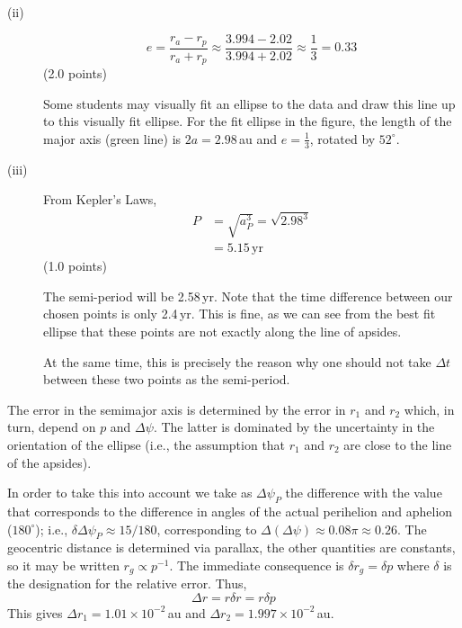 \begin{description}
\begin{description}
  \item[(ii)]
    \[
      e = \frac{r_a - r_p}{r_a + r_p}
        \approx \frac{3.994 - 2.02}{3.994 + 2.02}
        \approx \frac{1}{3} = 0.33
    \]
    \hfill(2.0 points)

    Some students may visually fit an ellipse to the data and draw this line
    up to this visually fit ellipse. For the fit ellipse in the figure, the
    length of the major axis (green line) is $2a = 2.98$\,au and
    $e = \frac{1}{3}$, rotated by $52^\circ$. %

  \item[(iii)] From Kepler's Laws,
    \begin{align*}
      P &= \sqrt{a_P^3} = \sqrt{2.98^3} \\
        &= 5.15\,\mathrm{yr}
    \end{align*}
    \hfill(1.0 points)

    The semi-period will be 2.58\,yr. Note that the time difference between
    our chosen points is only 2.4\,yr. This is fine, as we can see from the
    best fit ellipse that these points are not exactly along the line of
    apsides.

    At the same time, this is precisely the reason why one should not take
    $\Delta t$ between these two points as the semi-period.
  \end{description}

\item[(c)] The error in the semimajor axis is determined by the error in $r_1$
  and $r_2$ which, in turn, depend on $p$ and $\Delta\psi$. The latter is
  dominated by the uncertainty in the orientation of the ellipse (i.e., the
  assumption that $r_1$ and $r_2$ are close to the line of the apsides).

  In order to take this into account we take as $\Delta\psi_P$ the difference
  with the value that corresponds to the difference in angles of the actual
  perihelion and aphelion ($180^\circ$); i.e.,
  $\delta\Delta\psi_P \approx 15/180$, corresponding to
  $\Delta(\Delta\psi) \approx 0.08\pi \approx 0.26$. The geocentric distance
  is determined via parallax, the other quantities are constants, so it may be
  written $r_g \propto p^{-1}$. The immediate consequence is
  $\delta r_g = \delta p$ where $\delta$ is the designation for the relative
  error. Thus,
  \[
    \Delta r = r\delta r = r\delta p
  \]
  This gives $\Delta r_1 = 1.01\times10^{-2}$\,au and
  $\Delta r_2 = 1.997\times10^{-2}$\,au.


\end{description}

